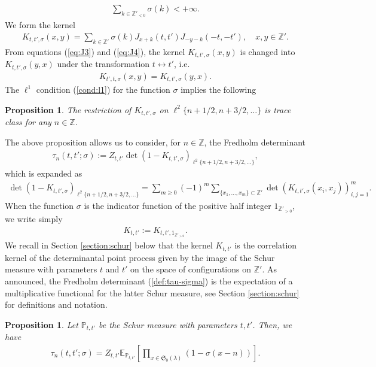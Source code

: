 \documentclass[12pt]{amsart}
\newtheorem{prop}[thm]{Proposition}
\theoremstyle{definition}
\renewcommand{\P}{\mathbb{P}}
\newcommand{\Z}{\mathbb{Z}}
\newcommand{\E}{\mathbb{E}}
\begin{document}
\begin{align} \label{cond:l1}
\sum_{ k \in \Z'_{<0}} \sigma(k) <+ \infty.
\end{align}
We form the kernel
\begin{align} \label{eq:defK}
K_{t,t',\sigma}(x,y) = \sum_{k \in \Z'} \sigma(k) J_{x +k}(t,t') J_{-y-k}(-t,-t'), \quad x,y \in \Z'.
\end{align}
From equations (\ref{eq:J3}) and (\ref{eq:J4}), the kernel $K_{t,t',\sigma}(x,y)$ is changed into $K_{t,t',\sigma}(y,x)$ under the transformation $ t \leftrightarrow t'$, i.e.
\begin{align} \label{eq:symK}
    K_{t',t,\sigma}(x,y) = K_{t,t',\sigma}(y,x).
\end{align}
The $\ell^1$ condition (\ref{cond:l1}) for the function $\sigma$ implies the following
\begin{prop} \label{prop:prop1}
The restriction of $K_{t,t',\sigma}$ on $\ell^2 \{n +1/2,n+3/2,\dots \}$ is trace class for any $n \in \Z$.
\end{prop}
The above proposition allows us to consider, for $n \in \Z$, the Fredholm determinant
\begin{align} \label{def:tau-sigma}
\tau_n (t,t';\sigma) := Z_{t,t'} \det(1 - K_{t,t',\sigma})_{\ell^2 \{n+1/2, n+3/2, \dots\}}, 
\end{align}
which is expanded as
\begin{align}
    \det(1 - K_{t,t',\sigma})_{\ell^2 \{n+1/2, n+3/2, \dots\}} = \sum_{m \geq 0} (-1)^m \sum_{\{x_1,\dots,x_m \} \subset \Z'} \det(K_{t,t',\sigma}(x_i,x_j))_{i,j=1}^m.
\end{align}
When the function $\sigma$ is the indicator function of the positive half integer $\mathfrak{1}_{\Z'_{>0}}$, we write simply 
\begin{align} \label{eq:defKshort}
   K_{t,t'} := K_{t,t', \mathfrak{1}_{\Z'_{>0}}}. 
\end{align}
We recall in Section \ref{section:schur} below that the kernel $K_{t,t'}$ is the correlation kernel of the determinantal point process given by the image of the Schur measure with parameters $t$ and $t'$ on the space of configurations on $\Z'$. As announced, the Fredholm determinant (\ref{def:tau-sigma}) is the expectation of a multiplicative functional for the latter Schur measure, see Section \ref{section:schur} for definitions and notation.
\begin{prop} \label{prop:prop2} Let $\P_{t,t'}$ be the Schur measure with parameters $t,t'$.
Then, we have
\begin{align*}
\tau_n(t,t';\sigma) = Z_{t,t'} \E_{\P_{t,t'}} \left[ \prod_{x \in \mathfrak{S}_0(\lambda)} (1- \sigma(x-n) )\right].
\end{align*}
\end{prop}
\end{document}
